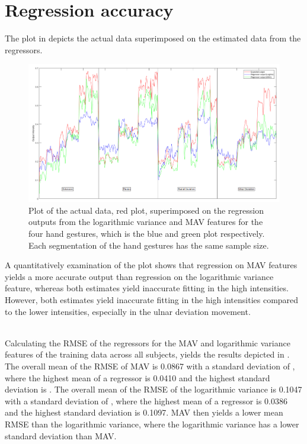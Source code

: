 \section{Regression accuracy}
The plot in  depicts the actual data superimposed on the estimated data from the regressors. 

\begin{figure}[H]
	\includegraphics[width=.4\textwidth]{figures/results/regressionOutputVsInput}  %
	\caption{Plot of the actual data, red plot, superimposed on the regression outputs from the logarithmic variance and MAV features for the four hand gestures, which is the blue and green plot respectively. Each segmentation of the hand gestures has the same sample size.}
	\label{fig:regressionOutputVsInput}  %
\end{figure}

A quantitatively examination of the plot shows that regression on MAV features yields a more accurate output than regression on the logarithmic variance feature, whereas both estimates yield inaccurate fitting in the high intensities. However, both estimates yield inaccurate fitting in the high intensities compared to the lower intensities, especially in the ulnar deviation movement.
  

\\

Calculating the RMSE of the regressors for the MAV and logarithmic variance features of the training data across all subjects, yields the results depicted in . The overall mean of the RMSE of MAV is 0.0867 with a standard deviation of , where the highest mean of a regressor is 0.0410 and the highest standard deviation is . The overall mean of the RMSE of the logarithmic variance is 0.1047 with a standard deviation of , where the highest mean of a regressor is 0.0386 and the highest standard deviation is 0.1097. MAV then yields a lower mean RMSE than the logarithmic variance, where the logarithmic variance has a lower standard deviation than MAV. 

